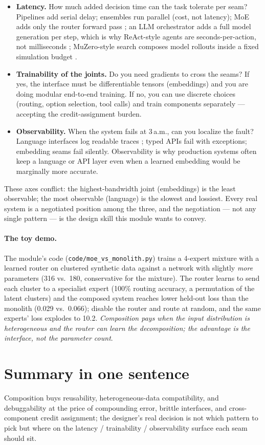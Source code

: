 \documentclass[11pt]{article}
\begin{document}
\begin{itemize}[noitemsep]
  \item \textbf{Latency.} How much added decision time can the task tolerate per seam? Pipelines add serial delay; ensembles run parallel (cost, not latency); MoE adds only the router forward pass \cite{shazeer2017sparsely}; an LLM orchestrator adds a full model generation per step, which is why ReAct-style agents are seconds-per-action, not milliseconds \cite{yao2023react}; MuZero-style search composes model rollouts inside a fixed simulation budget \cite{schrittwieser2020muzero}.
  \item \textbf{Trainability of the joints.} Do you need gradients to cross the seams? If yes, the interface must be differentiable tensors (embeddings) and you are doing modular end-to-end training. If no, you can use discrete choices (routing, option selection, tool calls) and train components separately --- accepting the credit-assignment burden.
  \item \textbf{Observability.} When the system fails at 3\,a.m., can you localize the fault? Language interfaces log readable traces \cite{yao2023react}; typed APIs fail with exceptions; embedding seams fail silently. Observability is why production systems often keep a language or API layer even when a learned embedding would be marginally more accurate.
\end{itemize}

These axes conflict: the highest-bandwidth joint (embeddings) is the least observable; the most observable (language) is the slowest and lossiest. Every real system is a negotiated position among the three, and the negotiation --- not any single pattern --- is the design skill this module wants to convey.

\paragraph{The toy demo.} The module's code (\texttt{code/moe\_vs\_monolith.py}) trains a 4-expert mixture with a learned router on clustered synthetic data against a network with slightly \emph{more} parameters (316 vs.\ 180, conservative for the mixture). The router learns to send each cluster to a specialist expert (100\% routing accuracy, a permutation of the latent clusters) and the composed system reaches lower held-out loss than the monolith (0.029 vs.\ 0.066); disable the router and route at random, and the same experts' loss explodes to 10.2. \emph{Composition pays when the input distribution is heterogeneous and the router can learn the decomposition; the advantage is the interface, not the parameter count}.

\section*{Summary in one sentence}
Composition buys reusability, heterogeneous-data compatibility, and debuggability at the price of compounding error, brittle interfaces, and cross-component credit assignment; the designer's real decision is not which pattern to pick but where on the latency / trainability / observability surface each seam should sit.

{\small


}
\end{document}
